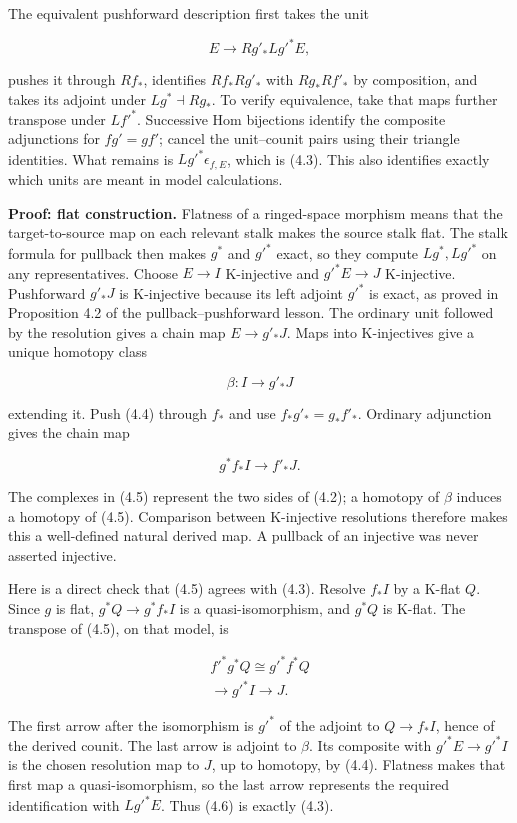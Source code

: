 \documentclass[
  english,
  11pt,
  a4paper,
]{article}
\begin{document}
The equivalent pushforward description first takes the unit

\[E\longrightarrow Rg'_*Lg'^*E,\]

pushes it through \(Rf_*\), identifies \(Rf_*Rg'_*\) with \(Rg_*Rf'_*\)
by composition, and takes its adjoint under \(Lg^*\dashv Rg_*\). To
verify equivalence, take that map\textquotesingle s further transpose
under \(Lf'^*\). Successive Hom bijections identify the composite
adjunctions for \(fg'=gf'\); cancel the unit--counit pairs using their
triangle identities. What remains is \(Lg'^*\epsilon_{f,E}\), which is
(4.3). This also identifies exactly which units are meant in model
calculations.

\textbf{Proof: flat construction.} Flatness of a ringed-space morphism
means that the target-to-source map on each relevant stalk makes the
source stalk flat. The stalk formula for pullback then makes \(g^*\) and
\(g'^*\) exact, so they compute \(Lg^*,Lg'^*\) on any representatives.
Choose \(E\to I\) K-injective and \(g'^*E\to J\) K-injective.
Pushforward \(g'_*J\) is K-injective because its left adjoint \(g'^*\)
is exact, as proved in Proposition 4.2 of the pullback--pushforward
lesson. The ordinary unit followed by the resolution gives a chain map
\(E\to g'_*J\). Maps into K-injectives give a unique homotopy class

\[\beta:I\longrightarrow g'_*J
\tag{4.4}\]

extending it. Push (4.4) through \(f_*\) and use \(f_*g'_* = g_*f'_*\).
Ordinary adjunction gives the chain map

\[g^*f_*I\longrightarrow f'_*J.
\tag{4.5}\]

The complexes in (4.5) represent the two sides of (4.2); a homotopy of
\(\beta\) induces a homotopy of (4.5). Comparison between K-injective
resolutions therefore makes this a well-defined natural derived map. A
pullback of an injective was never asserted injective.

Here is a direct check that (4.5) agrees with (4.3). Resolve \(f_*I\) by
a K-flat \(Q\). Since \(g\) is flat, \(g^*Q\to g^*f_*I\) is a
quasi-isomorphism, and \(g^*Q\) is K-flat. The transpose of (4.5), on
that model, is

\[\begin{gathered}
f'^*g^*Q\cong g'^*f^*Q\\
\longrightarrow g'^*I\longrightarrow J.
\end{gathered}
\tag{4.6}\]

The first arrow after the isomorphism is \(g'^*\) of the adjoint to
\(Q\to f_*I\), hence of the derived counit. The last arrow is adjoint to
\(\beta\). Its composite with \(g'^*E\to g'^*I\) is the chosen
resolution map to \(J\), up to homotopy, by (4.4). Flatness makes that
first map a quasi-isomorphism, so the last arrow represents the required
identification with \(Lg'^*E\). Thus (4.6) is exactly (4.3).
\end{document}
